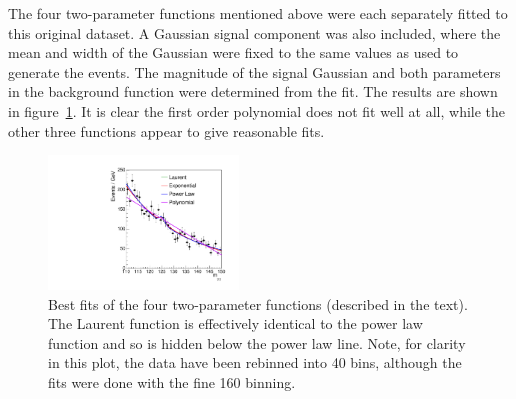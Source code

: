 The four two-parameter functions mentioned above were each 
separately fitted to this
original dataset. A Gaussian signal component was also included, where the
mean and width of the Gaussian were fixed to the same values as used to
generate the events.
The magnitude of the signal Gaussian and both parameters in the
background function were determined from the fit.
The results are shown in figure~\ref{fig:functions:bestfits}.
It is clear the first order polynomial does not fit well at all, while the 
other three functions appear to give reasonable fits.
%
\begin{figure}[tbp]
\centering
\includegraphics[width=0.45\textwidth]{functions/BestFits.pdf}
\caption{Best fits of the four two-parameter functions (described in the
text). The Laurent function is effectively identical to the power law function
and so is hidden below the power law line. Note, for clarity in this plot, the
data have been rebinned into 40 bins, although the fits were done with the
fine 160 binning.}
\label{fig:functions:bestfits}
\end{figure}

